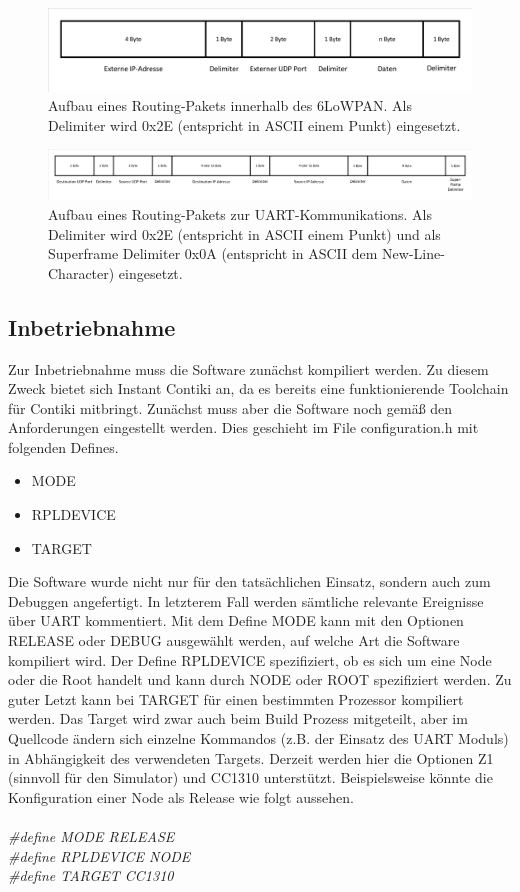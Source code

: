 \begin{figure}
	\centering
	\includegraphics[width=\textwidth]{Grafiken-Alex/komm-intern.pdf}
	\caption{Aufbau eines Routing-Pakets innerhalb des 6LoWPAN. Als Delimiter wird 0x2E (entspricht in ASCII einem Punkt) eingesetzt.}
	\label{komm-intern}
\end{figure}
\begin{figure}
	\centering
	\includegraphics[width=\textwidth]{Grafiken-Alex/komm-extern.pdf}
	\caption{Aufbau eines Routing-Pakets zur UART-Kommunikations. Als Delimiter wird 0x2E (entspricht in ASCII einem Punkt) und als Superframe Delimiter 0x0A (entspricht in ASCII dem New-Line-Character) eingesetzt.}
	\label{komm-intern}
\end{figure}

\subsection{Inbetriebnahme}
Zur Inbetriebnahme muss die Software zunächst kompiliert werden. Zu diesem Zweck bietet sich Instant Contiki an, da es bereits eine funktionierende Toolchain für Contiki mitbringt. Zunächst muss aber die Software noch gemäß den Anforderungen eingestellt werden. Dies geschieht im File configuration.h mit folgenden Defines.
\begin{itemize}
	\item MODE 		
	\item RPLDEVICE	
	\item TARGET		
\end{itemize}
Die Software wurde nicht nur für den tatsächlichen Einsatz, sondern auch zum Debuggen angefertigt. In letzterem Fall werden sämtliche relevante Ereignisse über UART kommentiert. Mit dem Define MODE kann mit den Optionen RELEASE oder DEBUG ausgewählt werden, auf welche Art die Software kompiliert wird. Der Define RPLDEVICE spezifiziert, ob es sich um eine Node oder die Root handelt und kann durch NODE oder ROOT spezifiziert werden. Zu guter Letzt kann bei TARGET für einen bestimmten Prozessor kompiliert werden. Das Target wird zwar auch beim Build Prozess mitgeteilt, aber im Quellcode ändern sich einzelne Kommandos (z.B. der Einsatz des UART Moduls) in Abhängigkeit des verwendeten Targets. Derzeit werden hier die Optionen Z1 (sinnvoll für den Simulator) und CC1310 unterstützt. Beispielsweise könnte die Konfiguration einer Node als Release wie folgt aussehen.\\
\\
\emph{\#define MODE 		RELEASE \\	
	\#define RPLDEVICE	NODE \\	
	\#define TARGET		CC1310 } \\

